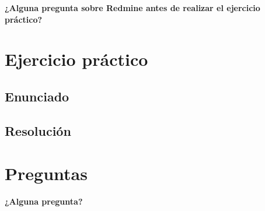 \documentclass[
xcolor={svgnames},
hyperref={colorlinks,citecolor=DeepPink4,linkcolor=Black,urlcolor=DarkBlue}
]{beamer}
\begin{document}
\begin{frame}
	\begin{center}

		{\Large 		\textbf{¿Alguna pregunta sobre Redmine antes de realizar el ejercicio práctico?}}

	\end{center}

\end{frame}

\section{Ejercicio práctico}

\subsection{Enunciado}
\begin{frame}

\end{frame}

\subsection{Resolución}

\begin{frame}

\end{frame}

\section{Preguntas}

\begin{frame}
	\begin{center}
		{\Large 		\textbf{¿Alguna pregunta?}}
	\end{center}
\end{frame}

%
%	
%	 
%
%

\begin{frame}[plain]
	\titlepage
\end{frame}
\end{document}
